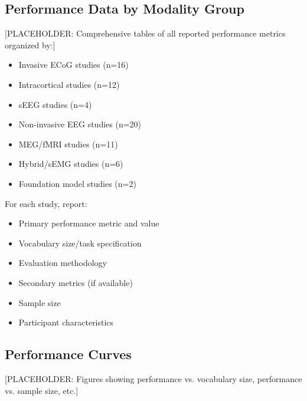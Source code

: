 
\subsection{Performance Data by Modality Group}

[PLACEHOLDER: Comprehensive tables of all reported performance metrics organized by:]
\begin{itemize}
    \item Invasive ECoG studies (n=16)
    \item Intracortical studies (n=12)
    \item sEEG studies (n=4)
    \item Non-invasive EEG studies (n=20)
    \item MEG/fMRI studies (n=11)
    \item Hybrid/sEMG studies (n=6)
    \item Foundation model studies (n=2)
\end{itemize}

For each study, report:
\begin{itemize}
    \item Primary performance metric and value
    \item Vocabulary size/task specification
    \item Evaluation methodology
    \item Secondary metrics (if available)
    \item Sample size
    \item Participant characteristics
\end{itemize}

\subsection{Performance Curves}

[PLACEHOLDER: Figures showing performance vs. vocabulary size, performance vs. sample size, etc.]

